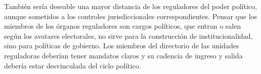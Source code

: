 \documentclass[
  12pt,
  spanish,
]{book}
\begin{document}
También sería deseable una mayor distancia de los reguladores del poder
político, aunque sometidos a los controles jurisdiccionales
correspondientes. Pensar que los miembros de los órganos reguladores son
cargos políticos, que entran o salen según los avatares electorales, no
sirve para la construcción de institucionalidad, sino para políticas de
gobierno. Los miembros del directorio de las unidades reguladoras
deberían tener mandatos claros y su cadencia de ingreso y salida debería
estar desvinculada del ciclo político.

\backmatter
  
\end{document}
